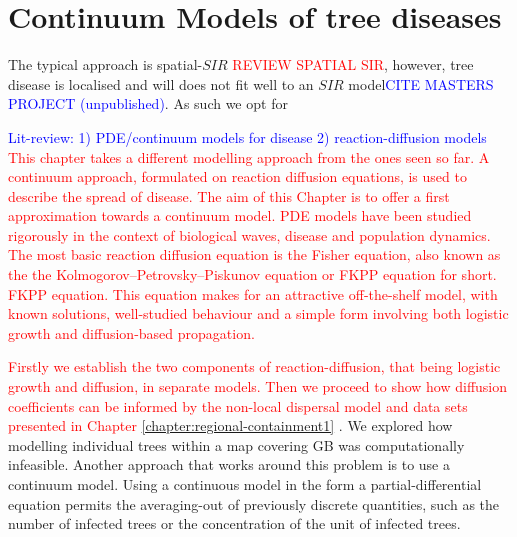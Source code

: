 
\chapter{Continuum Models of tree diseases}
The typical approach is spatial-$SIR$ \textcolor{red}{REVIEW SPATIAL SIR}, however, tree disease is localised and will does not fit well to an $SIR$ model\textcolor{blue}{CITE MASTERS PROJECT (unpublished)}. %
As such we opt for 

\textcolor{blue}{Lit-review: 1) PDE/continuum models for disease 2) reaction-diffusion models}
\textcolor{red}{This chapter takes a different modelling approach from the ones seen so far. %
A continuum approach, formulated on reaction diffusion equations, is used to describe the spread of disease. %
The aim of this Chapter is to offer a first approximation towards a continuum model. %
PDE models have been  studied rigorously in the context of biological waves, disease and population dynamics. %
The most basic reaction diffusion equation is the Fisher equation, also known as the the Kolmogorov–Petrovsky–Piskunov equation or FKPP equation for short. %
FKPP equation. This equation makes for an attractive off-the-shelf model, with known solutions, well-studied behaviour and a simple form involving both logistic growth and diffusion-based propagation.}                                                


\textcolor{red}{Firstly we establish the two components of reaction-diffusion, that being logistic growth and diffusion, in separate models. Then we proceed to show how diffusion coefficients can be informed by the non-local dispersal model and data sets presented in Chapter \ref{chapter:regional-containment1} }. We explored how modelling individual trees within a map covering GB  was computationally infeasible. Another approach that works around this problem is to use a continuum model. Using a continuous model in the form a partial-differential equation permits the averaging-out of previously discrete quantities, such as the number of infected trees or the concentration of the unit of infected  trees.

